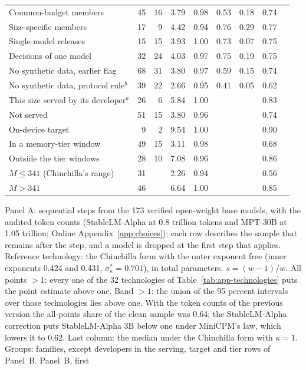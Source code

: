 \begin{table}[tp]
\begin{tabular*}{\textwidth}{@{\extracolsep{\fill}}lrrcccccc@{}}
Common-budget members & 45 & 16 & 3.79 & 0.98 & 0.53 & 0.18 & 0.74 & \\
Size-specific members & 17 & 9 & 4.42 & 0.94 & 0.76 & 0.29 & 0.77 & \\
Single-model releases & 15 & 15 & 3.93 & 1.00 & 0.73 & 0.07 & 0.75 & \\
Decisions of one model & 32 & 24 & 4.03 & 0.97 & 0.75 & 0.19 & 0.75 & \\
No synthetic data, earlier flag & 68 & 31 & 3.80 & 0.97 & 0.59 & 0.15 & 0.74 & \\
No synthetic data, protocol rule$^b$ & 39 & 22 & 2.66 & 0.95 & 0.41 & 0.05 & 0.62 & \\
This size served by its developer$^a$ & 26 & 6 & 5.84 & 1.00 &  &  & 0.83 & \\
Not served & 51 & 15 & 3.80 & 0.96 &  &  & 0.74 & \\
On-device target & 9 & 2 & 9.54 & 1.00 &  &  & 0.90 & \\
In a memory-tier window & 49 & 15 & 3.11 & 0.98 &  &  & 0.68 & \\
Outside the tier windows & 28 & 10 & 7.08 & 0.96 &  &  & 0.86 & \\
$M\le341$ (Chinchilla's range) & 31 &  & 2.26 & 0.94 &  &  & 0.56 & \\
$M>341$ & 46 &  & 6.64 & 1.00 &  &  & 0.85 & \\
\bottomrule
\end{tabular*}
\par\smallskip
\begin{tablenotes}
Panel A: sequential steps from the 173 verified open-weight base models, with the audited token counts (StableLM-Alpha
at 0.8 trillion tokens and MPT-30B at 1.05 trillion; Online Appendix~\ref{app:choices}); each row describes the sample
that remains after the step, and a model is dropped at the first step that applies. Reference technology: the Chinchilla
form with the outer exponent free (inner exponents 0.424 and 0.431, $\sigma^*_\kappa=0.701$), in total parameters.
$s=(w-1)/w$. All points $>1$: every one of the 32 technologies of Table~\ref{tab:app-technologies} puts the point
estimate above one. Band $>1$: the union of the 95 percent intervals over those technologies lies above one. With the
token counts of the previous version the all-points share of the clean sample was 0.64; the StableLM-Alpha correction puts
StableLM-Alpha 3B below one under MiniCPM's law, which lowers it to 0.62. Last column: the median under the Chinchilla
form with $\kappa=1$. Groups: families, except developers in the serving, target and tier rows of Panel~B. Panel~B, first

\end{tablenotes}
\end{table}
